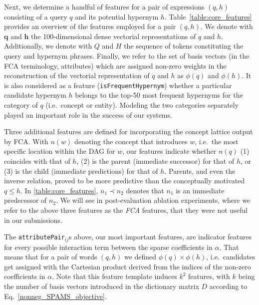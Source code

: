 \documentclass[11pt,a4paper]{article}
\begin{document}
Next, we determine a handful of features for a pair of expressions $(q, h)$
consisting of a query $q$ and its potential hypernym $h$.
Table~\ref{table:core_features} provides an overview of the features
employed for a pair $(q, h)$.
We denote with $\mathbf{q}$ and $\mathbf{h}$ the 100-dimensional dense
vectorial representations of $q$ and $h$.
Additionally, we denote with $Q$ and $H$ the sequence of tokens constituting
the query and hypernym phrases.
Finally, we refer to the set of basis vectors (in the FCA terminology,
attributes) which are assigned non-zero weights in the reconstruction of the
vectorial representation of $q$ and $h$ as $\phi(q)$ and $\phi(h)$.  
It is also considered as a feature (\texttt{isFrequentHypernym}) whether a
particular candidate hypernym $h$ belongs to the top-50 most frequent hypernyms
for the category of $q$ (i.e.~concept or entity).
Modeling the two categories separately played an important role in the success
of our systems.


Three additional features are defined for incorporating the concept lattice
output by FCA. With $n(w)$ denoting the concept that introduces $w$, i.e.~the
most specific location within the DAG for $w$, our features indicate whether
$n(q)$ 
(1) coincides with that of $h$,
(2) is the parent (immediate successor) for that of $h$, or
(3) is the child (immediate predictions) for that of $h$.
Parents, and even the inverse relation, proved to be more predictive
than the conceptually motivated  $q\le h$.
In \autoref{table:core_features}, $n_1\prec n_2$ denotes that $n_1$ is an
immediate predecessor of $n_2$.
We will see in post-evaluation ablation experiments, where we refer to the
above three features as the \emph{FCA} features, that they were not useful in
our submissions.



The \texttt{attributePair}$_{ij}$s above, our most important features, are 
indicator features for every possible interaction term 
between the sparse coefficients in $\alpha$. That means that for a pair of
words $(q, h)$ we defined $\phi(q) \times \phi(h)$, i.e.~candidates
get assigned with the Cartesian product derived from the indices of the non-zero
coefficients in $\alpha$. Note that this feature template induces $k^2$
features, with $k$ being the number of basis vectors introduced in the dictionary matrix $D$ according to Eq.~\ref{nonneg_SPAMS_objective}.
\end{document}
